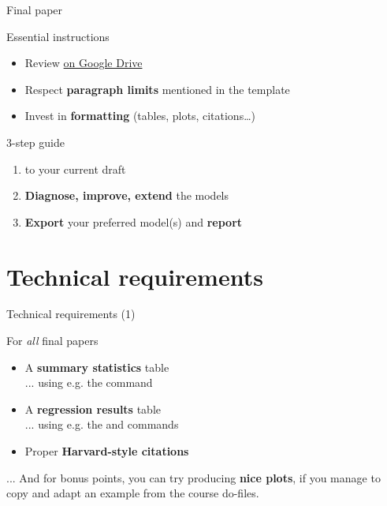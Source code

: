 \documentclass[t]{beamer}
\begin{document}
	\begin{frame}[t]{Final paper}

		\begin{block}{Essential instructions}

			\begin{itemize}
				\item Review  \href{https://docs.google.com/document/d/1s-lZWDen7RWPcsIdJoxIDa8Q7V-AGisz61Hg1bQpq8c/edit}{on Google Drive}%
				\item Respect \textbf{paragraph limits} mentioned in the template
				\item Invest in \textbf{formatting} (tables, plots, citations…)
			\end{itemize}
			
		\end{block}

		\begin{block}{3-step guide}

			\begin{enumerate}
				\item \textbf{} to your current draft
				\item \textbf{Diagnose, improve, extend} the models
				\item \textbf{Export} your preferred model(s) and \textbf{report}
			\end{enumerate}

		\end{block}
					
	\end{frame}

	\section{Technical requirements}

	\begin{frame}[t]{Technical requirements (1)}

		\begin{alertblock}{For \emph{all} final papers}

			\begin{itemize}
				\item A \textbf{summary statistics} table\\
        ... using e.g. the  command
				\item A \textbf{regression results} table\\
        ... using e.g. the  and  commands
				\item Proper \textbf{Harvard-style citations}
			\end{itemize}
			
		\end{alertblock}

		... And for bonus points, you can try producing \textbf{nice plots}, if you manage to copy and adapt an example from the course do-files.%
					
	\end{frame}
\end{document}
